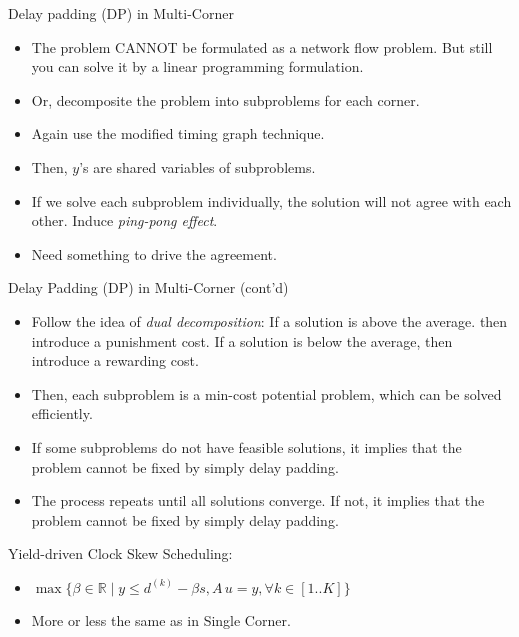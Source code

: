 \documentclass[10pt,ignorenonframetext,mathserif]{beamer}
\providecommand{\tightlist}{%
  \setlength{\itemsep}{0pt}\setlength{\parskip}{0pt}}
\begin{document}
\begin{frame}{Delay padding (DP) in Multi-Corner}

\begin{itemize}
\tightlist
\item
  The problem CANNOT be formulated as a network flow problem. But still
  you can solve it by a linear programming formulation.
\item
  Or, decomposite the problem into subproblems for each corner.
\item
  Again use the modified timing graph technique.
\item
  Then, \(y\)'s are shared variables of subproblems.
\item
  If we solve each subproblem individually, the solution will not agree
  with each other. Induce \emph{ping-pong effect}.
\item
  Need something to drive the agreement.
\end{itemize}

\end{frame}

\begin{frame}{Delay Padding (DP) in Multi-Corner (cont'd)}

\begin{itemize}
\tightlist
\item
  Follow the idea of \emph{dual decomposition}: If a solution is above
  the average. then introduce a punishment cost. If a solution is below
  the average, then introduce a rewarding cost.
\item
  Then, each subproblem is a min-cost potential problem, which can be
  solved efficiently.
\item
  If some subproblems do not have feasible solutions, it implies that
  the problem cannot be fixed by simply delay padding.
\item
  The process repeats until all solutions converge. If not, it implies
  that the problem cannot be fixed by simply delay padding.
\end{itemize}

\end{frame}

\begin{frame}{Yield-driven Clock Skew Scheduling:}

\begin{itemize}
\tightlist
\item
  \(\max\{\beta \in \mathbb{R} \mid y \leq d^{(k)} - \beta s, A\,u = y, \forall k\in[1..K]\}\)
\item
  More or less the same as in Single Corner.
\end{itemize}

\end{frame}
\end{document}
